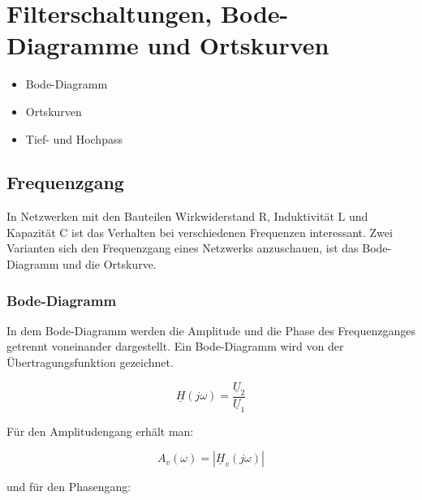 \documentclass[
  ngerman,
  letterpaper,
]{scrbook}
\providecommand{\tightlist}{%
  \setlength{\itemsep}{0pt}\setlength{\parskip}{0pt}}
\begin{document}
\chapter{Filterschaltungen, Bode-Diagramme und
Ortskurven}\label{filterschaltungen-bode-diagramme-und-ortskurven}

\begin{itemize}
\tightlist
\item
  Bode-Diagramm
\item
  Ortskurven
\item
  Tief- und Hochpass
\end{itemize}

\section{Frequenzgang}\label{frequenzgang}

In Netzwerken mit den Bauteilen Wirkwiderstand R, Induktivität L und
Kapazität C ist das Verhalten bei verschiedenen Frequenzen interessant.
Zwei Varianten sich den Frequenzgang eines Netzwerks anzuschauen, ist
das Bode-Diagramm und die Ortskurve.

\subsection{Bode-Diagramm}\label{bode-diagramm-1}

In dem Bode-Diagramm werden die Amplitude und die Phase des
Frequenzganges getrennt voneinander dargestellt. Ein Bode-Diagramm wird
von der Übertragungsfunktion gezeichnet.

\begin{tcolorbox}[enhanced jigsaw, titlerule=0mm, rightrule=.15mm, toprule=.15mm, colback=white, toptitle=1mm, bottomrule=.15mm, coltitle=black, leftrule=.75mm, arc=.35mm, colbacktitle=quarto-callout-note-color!10!white, opacityback=0, bottomtitle=1mm, colframe=quarto-callout-note-color-frame, opacitybacktitle=0.6, breakable, title=\textcolor{quarto-callout-note-color}{\faInfo}\hspace{0.5em}{Hinweis}, left=2mm]

\[\underline{H}(j\omega) = \frac{\underline{U}_2}{\underline{U}_1}\]

\end{tcolorbox}

Für den Amplitudengang erhält man:

\[A_v(\omega) = |\underline{H}_v(j\omega)|\]

und für den Phasengang:
\end{document}
